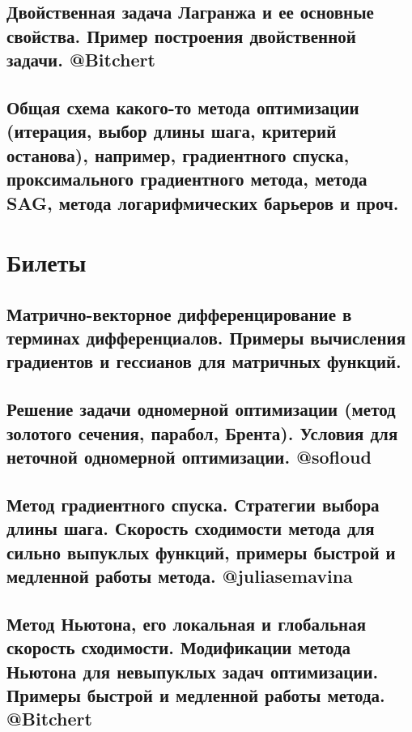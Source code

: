 \documentclass[a4paper, 16pt]{article}
\begin{document}
    

    \subsection{Двойственная задача Лагранжа и ее основные свойства. Пример построения двойственной задачи. @Bitchert}
    
    
    
    \subsection{Общая схема какого-то метода оптимизации (итерация, выбор длины шага, критерий останова), например, градиентного спуска, проксимального градиентного метода, метода SAG, метода логарифмических барьеров и проч.}

    

    \newpage

    \section{Билеты}
    \subsection{Матрично-векторное дифференцирование в терминах дифференциалов. Примеры вычисления градиентов и гессианов для матричных функций.}

    

    \subsection{Решение задачи одномерной оптимизации (метод золотого сечения, парабол, Брента). Условия для неточной одномерной оптимизации. @sofloud} 

    

    \subsection{Метод градиентного спуска. Стратегии выбора длины шага. Скорость сходимости метода для сильно выпуклых функций, примеры быстрой и медленной работы метода. @juliasemavina}
    
    
    
    \subsection{Метод Ньютона, его локальная и глобальная скорость сходимости. Модификации метода Ньютона для невыпуклых задач оптимизации. Примеры быстрой и медленной работы метода. @Bitchert}
    
\end{document}
